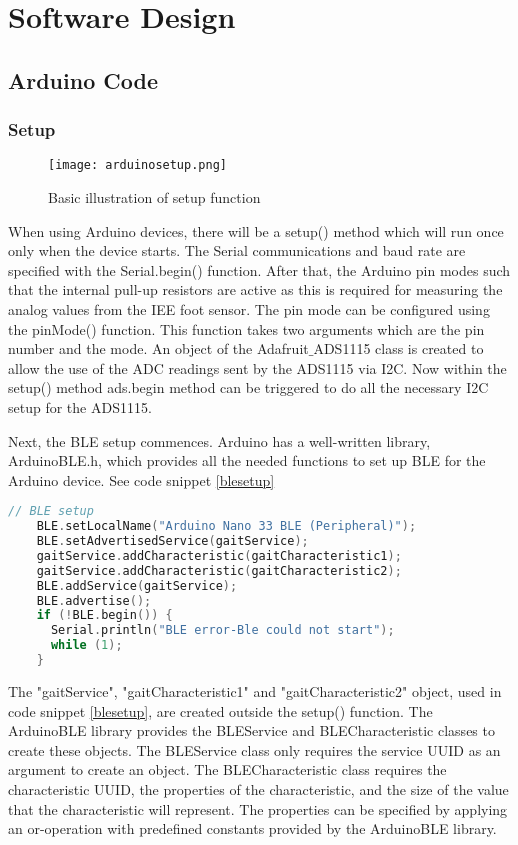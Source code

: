 \graphicspath{{detaileddesign/fig/}}

\chapter{Software Design}
\label{chap:systemdesign}


\section{Arduino Code}
\subsection{Setup}
\begin{wrapfigure}{r}{0.2\textwidth}
  \caption{Basic illustration of setup function}
  \texttt{[image: arduinosetup.png]}
\end{wrapfigure}
When using Arduino devices, there will be a setup() method which will run once only when the device starts. The Serial communications and baud rate are specified with the Serial.begin() function. After that, the Arduino pin modes such that  the internal pull-up resistors are active as this is required for measuring the analog values from the 
IEE foot sensor. The pin mode can be configured using the pinMode() function. This function takes two arguments which are the pin number and the mode. An object of the Adafruit$\_$ADS1115  class is created to allow the use of the ADC readings sent by the ADS1115 via I2C. Now within the setup() method ads.begin method can be triggered to do all the necessary I2C setup for the ADS1115.


Next, the BLE setup commences. Arduino has a well-written library, ArduinoBLE.h, which provides all the needed functions to set up BLE for the Arduino device. See code snippet \ref{blesetup}
\begin{lstlisting}[language=c++, caption=BLE Setup, label=blesetup]
    // BLE setup
    BLE.setLocalName("Arduino Nano 33 BLE (Peripheral)");
    BLE.setAdvertisedService(gaitService);
    gaitService.addCharacteristic(gaitCharacteristic1);
    gaitService.addCharacteristic(gaitCharacteristic2);
    BLE.addService(gaitService);
    BLE.advertise();
    if (!BLE.begin()) {
      Serial.println("BLE error-Ble could not start");
      while (1);
    }
\end{lstlisting}



The "gaitService", "gaitCharacteristic1" and  "gaitCharacteristic2" object, used in code snippet \ref{blesetup}, are created outside the setup() function. The ArduinoBLE library provides the BLEService and BLECharacteristic classes to create these objects. The BLEService class only requires the service UUID as an argument to create an object. The BLECharacteristic class requires the characteristic UUID, the properties of the characteristic, and the size of the value that the characteristic will represent. The properties can be specified by applying an or-operation with predefined constants provided by the ArduinoBLE library.

